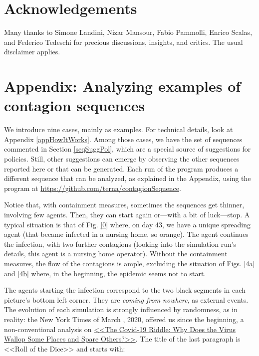 \documentclass[graybox]{svmult}
\begin{document}
\section*{Acknowledgements}

Many thanks to Simone Landini, Nizar Mansour, Fabio Pammolli, Enrico Scalas, and Federico Tedeschi for precious discussions, insights, and critics. The usual disclaimer applies.



\section{Appendix: Analyzing examples of contagion sequences}
\label{appContagion}


We introduce nine cases, mainly as examples. For technical details, look at Appendix \ref{appHowItWorks}. Among those cases, we have the set of sequences commented in Section \ref{seqSuggPol}, which are a special source of suggestions for policies. Still, other suggestions can emerge by observing the other sequences reported here or that can be generated. Each run of the program produces a different sequence that can be analyzed, as explained in the Appendix, using the program at \url{https://github.com/terna/contagionSequence}.

Notice that, with containment measures, sometimes the sequences get thinner, involving few agents. 
Then, they can start again or---with a bit of luck---stop. A typical situation is that of Fig. \ref{0} where, on day 43, we have a unique spreading agent (that became infected in a nursing home, so orange). The agent continues the infection, with two further contagions (looking into the simulation run's details, this agent is a nursing home operator). Without the containment measures, the flow of the contagions is ample, excluding the situation of Figs. \ref{4a} and \ref{4b} where, in the beginning, the epidemic seems not to start.

The agents starting the infection correspond to the two black segments in each picture's bottom left corner. They are  \emph{coming from nowhere}, as external events. The evolution of each simulation is strongly influenced by randomness, as in reality: the New York Times of March , 2020, offered us since the beginning, a non-conventional analysis on  
\href{https://www.nytimes.com/2020/05/03/world/asia/coronavirus-spread-where-why.html}{<<The Covid-19 Riddle: Why Does the Virus Wallop Some Places and Spare Others?>>}. The title of the last paragraph is <<Roll of the Dice>> and starts with:
\end{document}
